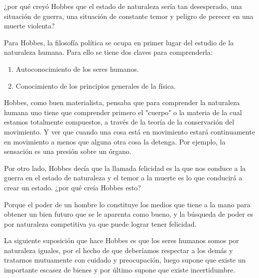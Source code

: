 ¿por qué creyó Hobbes que el estado de naturaleza sería tan desesperado, una situación de guerra, una situación de constante temor y peligro de perecer en una muerte violenta?

Para Hobbes, la filosofía política se ocupa en primer lugar del estudio de la naturaleza humana. Para ello se tiene dos claves para comprenderla:
\begin{enumerate}
    \item Autoconocimiento de los seres humanos.
    \item Conocimiento de los principios generales de la física.
\end{enumerate}
Hobbes, como buen materialista, pensaba que para comprender la naturaleza humana uno tiene que comprender primero el "cuerpo" o la materia de la cual estamos totalmente compuestos, a través de la teoría de la conservación del movimiento. Y ver que cuando una cosa está en movimiento estará continuamente en movimiento a menos que alguna otra cosa la detenga. Por ejemplo, la sensación es una presión sobre un órgano.

Por otro lado, Hobbes decía que la llamada felicidad es la que nos conduce a la guerra en el estado de naturaleza y el temor a la muerte es lo que conducirá a crear un estado. ¿por qué creía Hobbes esto?

Porque el poder de un  hombre lo constituye los medios que tiene a la mano para obtener un bien futuro que se le aparenta como bueno, y la búsqueda de poder es por naturaleza competitiva ya que puede lograr tener felicidad.

La siguiente suposición que hace Hobbes es que los seres humanos somos por naturaleza iguales, por el hecho de que deberíamos respectar a los demás y tratarnos mutuamente con cuidado y preocupación, luego supone que existe un importante escasez de bienes y por último supone que existe incertidumbre. 


